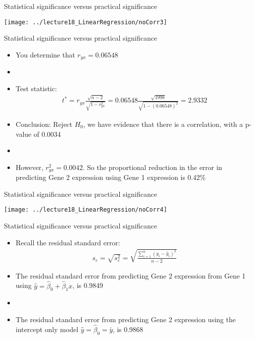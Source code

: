 \documentclass[xcolor=dvipsnames]{beamer}
\begin{document}
\begin{frame}{Statistical significance versus practical significance}
	\begin{center}
		\texttt{[image: ../lecture18\_LinearRegression/noCorr3]}
	\end{center}
\end{frame}

\begin{frame}{Statistical significance versus practical significance}
	\begin{itemize}
	\item You determine that $r_{yx} = 0.06548$ \pause
	\item[]
	\item Test statistic: \pause
	\begin{gather*}
		t^* = r_{yx} \frac{\sqrt{n-2}}{\sqrt{1-r^2_{yx}}} = 0.06548 \frac{\sqrt{1998}}{\sqrt{1-(0.06548)^2}} = 2.9332
	\end{gather*} \pause
	\item Conclusion: Reject $H_0$, we have evidence that there is a correlation, with a p-value of 0.0034 \pause
	\item[]
	\item However, $ r_{yx}^2 = 0.0042$. So the proportional reduction in the error in predicting Gene 2 expression using Gene 1 expression is 0.42\% 
	\end{itemize}
\end{frame}

\begin{frame}{Statistical significance versus practical significance}
	\begin{center}
		\texttt{[image: ../lecture18\_LinearRegression/noCorr4]}
	\end{center}
\end{frame}

\begin{frame}{Statistical significance versus practical significance}
	\begin{itemize}
		\item Recall the residual standard error: \pause
		\begin{gather*}
		s_{\varepsilon} = \sqrt{s^2_{\varepsilon}} = \sqrt{\frac{\sum_{i=1}^{n}\left(y_i - \hat{y}_i\right)^2}{n-2}}
		\end{gather*} \pause
		\item The residual standard error from predicting Gene 2 expression from Gene 1 using $\hat{y} = \hat{\beta}_0 + \hat{\beta}_1 x$, is 0.9849 \pause
		\item[]
		\item The residual standard error from predicting Gene 2 expression using the intercept only model $\hat{y}=\hat{\beta}_0 = \bar{y}$, is 0.9868
	\end{itemize}
\end{frame}
\end{document}
